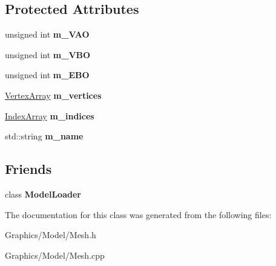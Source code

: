 \subsection*{Protected Attributes}
\begin{DoxyCompactItemize}
\item 
\mbox{\label{classce_1_1graphics_1_1_mesh_a8a9d810a84babc359088216a34149004}} 
unsigned int {\bfseries m\+\_\+\+V\+AO}
\item 
\mbox{\label{classce_1_1graphics_1_1_mesh_a4b1ba8be0e3005bbe35ab9b65525f16d}} 
unsigned int {\bfseries m\+\_\+\+V\+BO}
\item 
\mbox{\label{classce_1_1graphics_1_1_mesh_a40681c51b3147e18129b82b768ff935e}} 
unsigned int {\bfseries m\+\_\+\+E\+BO}
\item 
\mbox{\label{classce_1_1graphics_1_1_mesh_a7ef8ad299b4f4c9d9488f6c547d4fd7e}} 
\hyperlink{_vertex_8h_a72d0effc290681342d1fc2b5fffa6aef}{Vertex\+Array} {\bfseries m\+\_\+vertices}
\item 
\mbox{\label{classce_1_1graphics_1_1_mesh_a94287f8ee272274fe7ee4a6716f2c509}} 
\hyperlink{_vertex_8h_a25b1e42db1e356e8bfc3ab61ade25040}{Index\+Array} {\bfseries m\+\_\+indices}
\item 
\mbox{\label{classce_1_1graphics_1_1_mesh_aa6598a29dc63d2e99adc85b78168c675}} 
std\+::string {\bfseries m\+\_\+name}
\end{DoxyCompactItemize}
\subsection*{Friends}
\begin{DoxyCompactItemize}
\item 
\mbox{\label{classce_1_1graphics_1_1_mesh_ac22dade55c1e8f81ea3e0892cd321190}} 
class {\bfseries Model\+Loader}
\end{DoxyCompactItemize}


The documentation for this class was generated from the following files\+:\begin{DoxyCompactItemize}
\item 
Graphics/\+Model/Mesh.\+h\item 
Graphics/\+Model/Mesh.\+cpp\end{DoxyCompactItemize}
